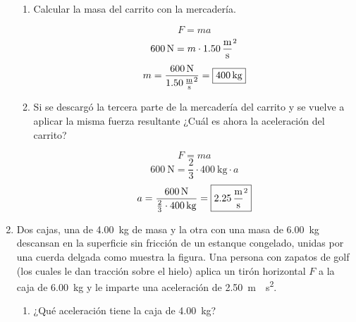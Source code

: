 \documentclass[Física - Práctica.root.tex]{subfiles}
\begin{document}
\begin{enumerate}
        \begin{enumerate}
          \item Calcular la masa del carrito con la mercadería.

                \[F=ma\]
                \[\SI{600}{\newton}=m\cdot\SI{1,50}{\meter\over\second\squared}\]
                \[m=\frac{\SI{600}{\newton}}{\SI{1,50}{\meter\over\second\squared}}=\boxed{\SI{400}{\kilogram}}\]

          \item Si se descargó la tercera parte de la mercadería del carrito y se vuelve a aplicar la misma fuerza resultante ¿Cuál es ahora la aceleración del carrito?

                \[F=ma\]
                \[\SI{600}{\newton}=\frac{2}{3}\cdot\SI{400}{\kilogram}\cdot a\]
                \[a=\frac{\SI{600}{\newton}}{\frac{2}{3}\cdot\SI{400}{\kilogram}}=\boxed{\SI{2,25}{\meter\over\second\squared}}\]
        \end{enumerate}

  \item Dos cajas, una de \SI{4,00}{\kg} de masa y la otra con una masa de \SI{6,00}{\kg} descansan en la superficie sin fricción de un estanque congelado, unidas por una cuerda delgada como muestra la figura. Una persona con zapatos de golf (los cuales le dan tracción sobre el hielo) aplica un tirón horizontal $F$ a la caja de \SI{6,00}{\kg} y le imparte una aceleración de \SI{2,50}{\meter\over\second\squared}.

        \begin{center}
        \end{center}

        \begin{enumerate}
          \item ¿Qué aceleración tiene la caja de \SI{4,00}{\kg}?


\end{enumerate}
\end{enumerate}
\end{document}
